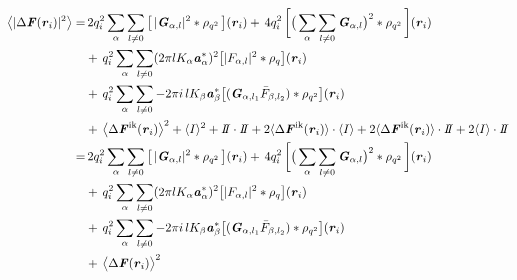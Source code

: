 \documentclass[aps,pre,preprint]{revtex4}
\renewcommand{\v}[1]{\textbf{\textit{#1}}}
\begin{document}
\begin{align}\nonumber
  \big\langle
  \vert \Delta\v F(\v r_i)\vert^2
  \big\rangle
  =&\, 
  2q_i^2
  \sum_{\alpha} \sum_{l\neq 0}
  \big[\,
  \vert \v G_{\alpha,l}\vert^2
  \ast \rho_{q^2}
  \,\big] (\v r_i) 
  +\,
  4q_i^2\,
  \bigg[
  \big(
  \sum_{\alpha} \sum_{l\neq 0}  
  \v G_{\alpha,l}
  \big)^2
  \ast \rho_{q^2}\,
  \bigg] (\v r_i) \\\nonumber
  & +\,
  q_i^2
  \sum_{\alpha}\sum_{l\neq 0}
   (2\pi l K_\alpha\v a_\alpha^\ast)^2
  \big[
  \vert F_{\alpha,l} \vert^2
  \ast \rho_q
  \big]
  (\v r_i)  \\\nonumber
  & +\,
  q^2_i
  \sum_{\alpha}\sum_{l\neq 0}
  -2\pi i\,l K_\beta \v a_\beta ^\ast
  \big[
  (\v G_{\alpha,l_1} \bar F_{\beta,l_2}) \ast \rho_{q^2}
  \big] (\v r_i)  \\\nonumber
  &+\,
  \big\langle
  \Delta\v F^{\textrm{ik}}(\v r_i)
  \big\rangle  ^2 +
  \langle I\rangle^2  + I\negthickspace I\cdot I\negthickspace I
  + 2\langle\Delta\v F^{\textrm{ik}}(\v r_i)\rangle \cdot\langle I\rangle
  + 2\langle\Delta\v F^{\textrm{ik}}(\v r_i)\rangle\cdot I\negthickspace I
  + 2\langle I\rangle\cdot I\negthickspace I \\\nonumber
  =&\,
  2q_i^2
  \sum_{\alpha} \sum_{l\neq 0}
  \big[\,
  \vert \v G_{\alpha,l}\vert^2
  \ast \rho_{q^2}
  \,\big] (\v r_i) 
  +\,
  4q_i^2\,
  \bigg[
  \big(
  \sum_{\alpha} \sum_{l\neq 0}  
  \v G_{\alpha,l}
  \big)^2
  \ast \rho_{q^2}\,
  \bigg] (\v r_i) \\\nonumber
  & +\,
  q_i^2
  \sum_{\alpha}\sum_{l\neq 0}
   (2\pi l K_\alpha\v a_\alpha^\ast)^2
  \big[
  \vert F_{\alpha,l} \vert^2
  \ast \rho_q
  \big]
  (\v r_i)  \\\nonumber
  & +\,
  q^2_i
  \sum_{\alpha}\sum_{l\neq 0}
  -2\pi i\,l K_\beta \v a_\beta ^\ast
  \big[
  (\v G_{\alpha,l_1} \bar F_{\beta,l_2}) \ast \rho_{q^2}
  \big] (\v r_i)  \\
  & +\,
  \big\langle \Delta\v F(\v r_i)\big\rangle ^2
\end{align}
\end{document}
